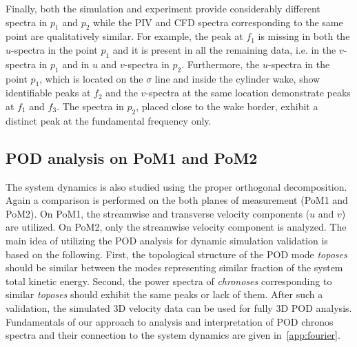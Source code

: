 
Finally, both the simulation and experiment provide considerably different spectra in $p_{1}$ and $p_{2}${ while }the {PIV and CFD} spectra corresponding to the same point {are} qualitatively similar. For example, the peak at $f_{1}$ is missing in both the $u$-spectra in {the} point $p_{1}$ and it is present in all the remaining data, i.e. in the $v$-spectra in $p_{1}$ and in $u$ and $v$-spectra in $p_{2}$. Furthermore, the $u$-spectra in {the} point $p_{1}$, which is located on the $\sigma$ line and inside the cylinder wake{,} show identifiable peaks at $f_{2}$ and the $v$-spectra at the same location demonstrate peaks at $f_{1}$ and $f_{3}$. The spectra in $p_{2}$, placed close to the wake border, exhibit a distinct peak at the fundamental frequency only.

\subsection{POD analysis on PoM1 and PoM2}
\label{sub:2DPOD}



The system dynamics is also studied using the proper orthogonal decomposition. Again a comparison is performed on the both planes of measurement (PoM1 and PoM2). On PoM1, the streamwise and {transverse} velocity components ($u$ and $v$) are utilized. {On} PoM2, {only} the streamwise velocity component is analyzed. The main idea of utilizing the POD analysis for dynamic simulation validation is based on the following. First, the topological structure of the POD mode \textit{toposes} should be similar between the modes representing similar fraction of the system total kinetic energy. Second, the power spectra of \textit{chronoses} corresponding to similar \textit{toposes} should exhibit the same peaks or lack of them. After such a validation, the simulated 3D velocity data can be used for fully 3D POD analysis.  {Fundamentals of our approach to analysis and interpretation of POD chronos spectra and their connection to the system dynamics are given in~\ref{app:fourier}.}

